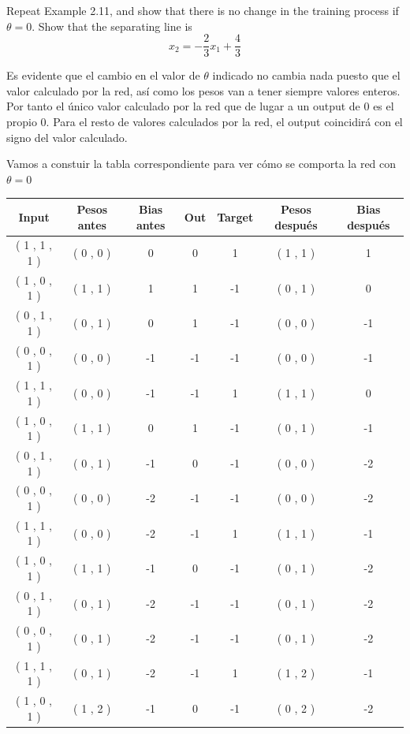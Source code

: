 \begin{problem}[11]
 Repeat Example 2.11, and show that there is no change in the training process if
$\theta = 0$. Show that the separating line is
\[x_2=-\frac{2}{3}x_1+\frac{4}{3}\]
\solution

Es evidente que el cambio en el valor de $\theta$ indicado no cambia nada puesto que el valor calculado por la red, así como los pesos van a tener siempre valores enteros. Por tanto el único valor calculado por la red que de lugar a un output de 0 es el propio 0. Para el resto de valores calculados por la red, el output coincidirá con el signo del valor calculado.

Vamos a constuir la tabla correspondiente para ver cómo se comporta la red con $\theta = 0$

\begin{center}
\begin{tabular}{|c|c|c|c|c|c|c|}
\hline
\textbf{Input} & \textbf{Pesos antes} &  \textbf{Bias antes} & \textbf{Out} & \textbf{Target} & \textbf{Pesos después} & \textbf{Bias después} \\
\hline
( 1 , 1 , 1 ) & ( 0 , 0 ) &  0  &  0  &  1  & ( 1 , 1 ) &  1  \\
( 1 , 0 , 1 ) & ( 1 , 1 ) &  1  &  1  &  -1  & ( 0 , 1 ) &  0  \\
( 0 , 1 , 1 ) & ( 0 , 1 ) &  0  &  1  &  -1  & ( 0 , 0 ) &  -1  \\
( 0 , 0 , 1 ) & ( 0 , 0 ) &  -1  &  -1  &  -1  & ( 0 , 0 ) &  -1  \\
( 1 , 1 , 1 ) & ( 0 , 0 ) &  -1  &  -1  &  1  & ( 1 , 1 ) &  0  \\
( 1 , 0 , 1 ) & ( 1 , 1 ) &  0  &  1  &  -1  & ( 0 , 1 ) &  -1  \\
( 0 , 1 , 1 ) & ( 0 , 1 ) &  -1  &  0  &  -1  & ( 0 , 0 ) &  -2  \\
( 0 , 0 , 1 ) & ( 0 , 0 ) &  -2  &  -1  &  -1  & ( 0 , 0 ) &  -2  \\
( 1 , 1 , 1 ) & ( 0 , 0 ) &  -2  &  -1  &  1  & ( 1 , 1 ) &  -1  \\
( 1 , 0 , 1 ) & ( 1 , 1 ) &  -1  &  0  &  -1  & ( 0 , 1 ) &  -2  \\
( 0 , 1 , 1 ) & ( 0 , 1 ) &  -2  &  -1  &  -1  & ( 0 , 1 ) &  -2  \\
( 0 , 0 , 1 ) & ( 0 , 1 ) &  -2  &  -1  &  -1  & ( 0 , 1 ) &  -2  \\
( 1 , 1 , 1 ) & ( 0 , 1 ) &  -2  &  -1  &  1  & ( 1 , 2 ) &  -1  \\
( 1 , 0 , 1 ) & ( 1 , 2 ) &  -1  &  0  &  -1  & ( 0 , 2 ) &  -2  \\

\end{tabular}
\end{center}
\end{problem}
